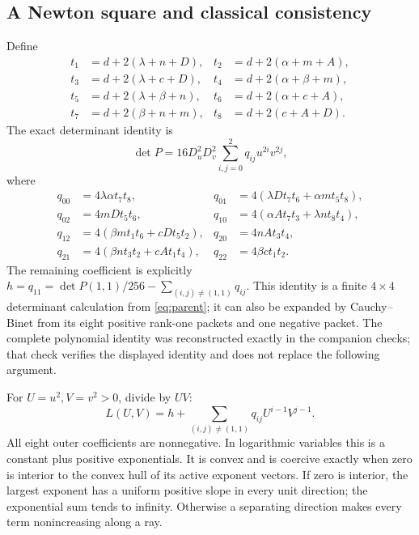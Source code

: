 \subsection{A Newton square and classical consistency}
Define
\begin{align*}
t_1&=d+2(\lambda+n+D),&t_2&=d+2(\alpha+m+A),\\
t_3&=d+2(\lambda+c+D),&t_4&=d+2(\alpha+\beta+m),\\
t_5&=d+2(\lambda+\beta+n),&t_6&=d+2(\alpha+c+A),\\
t_7&=d+2(\beta+n+m),&t_8&=d+2(c+A+D).
\end{align*}
The exact determinant identity is
\[
\det P=16D_u^2D_v^2\sum_{i,j=0}^2q_{ij}u^{2i}v^{2j},
\]
where
\begin{align*}
q_{00}&=4\lambda\alpha t_7t_8,&q_{01}&=4(\lambda Dt_7t_6+\alpha mt_5t_8),\\
q_{02}&=4mDt_5t_6,&q_{10}&=4(\alpha At_7t_3+\lambda nt_8t_4),\\
q_{12}&=4(\beta mt_1t_6+cDt_5t_2),&q_{20}&=4nAt_3t_4,\\
q_{21}&=4(\beta nt_3t_2+cAt_1t_4),&q_{22}&=4\beta ct_1t_2.
\end{align*}
The remaining coefficient is explicitly $h=q_{11}=\det P(1,1)/256-\sum_{(i,j)\ne(1,1)}q_{ij}$. This identity is a finite $4\times4$ determinant calculation from \eqref{eq:parent}; it can also be expanded by Cauchy--Binet from its eight positive rank-one packets and one negative packet. The complete polynomial identity was reconstructed exactly in the companion checks; that check verifies the displayed identity and does not replace the following argument.

For $U=u^2,V=v^2>0$, divide by $UV$:
\[L(U,V)=h+\sum_{(i,j)\ne(1,1)}q_{ij}U^{i-1}V^{j-1}.\]
All eight outer coefficients are nonnegative. In logarithmic variables this is a constant plus positive exponentials. It is convex and is coercive exactly when zero is interior to the convex hull of its active exponent vectors. If zero is interior, the largest exponent has a uniform positive slope in every unit direction; the exponential sum tends to infinity. Otherwise a separating direction makes every term nonincreasing along a ray.

